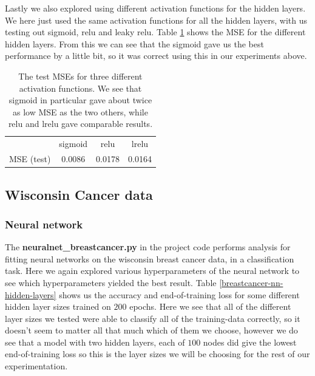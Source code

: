 \documentclass{article}
\begin{document}
Lastly we also explored using different activation functions for the hidden
layers. We here just used the same activation functions for all the hidden
layers, with us testing out sigmoid, relu and leaky relu. Table
\ref{franke-different-activ-funcs} shows the MSE for the different hidden
layers. From this we can see that the sigmoid gave us the best performance by a
little bit, so it was correct using this in our experiments above.

\begin{table}
      \centering
      \begin{tabular}{| c | c | c | c |}
                       & sigmoid & relu   & lrelu  \\
            MSE (test) & 0.0086  & 0.0178 & 0.0164
      \end{tabular}
      \caption{The test MSEs for three different activation functions. We see
            that sigmoid in particular gave about twice as low MSE as the two others,
            while relu and lrelu gave comparable results.}
      \label{franke-different-activ-funcs}
\end{table}


\subsection{Wisconsin Cancer data}
\subsubsection{Neural network}
The \textbf{neuralnet\_breastcancer.py} in the project code performs analysis for
fitting neural networks on the wisconsin breast cancer data, in a classification
task. Here we again explored various hyperparameters of the neural network to
see which hyperparameters yielded the best result. Table \ref{breastcancer-nn-hidden-layers}
shows us the accuracy and end-of-training loss for some different hidden layer sizes trained on $200$ epochs.
Here we see that all of the different layer sizes we tested were able to classify
all of the training-data correctly, so it doesn't seem to matter all that much
which of them we choose, however we do see that a model with two hidden layers,
each of $100$ nodes did give the lowest end-of-training loss so this is the
layer sizes we will be choosing for the rest of our experimentation.
\end{document}
